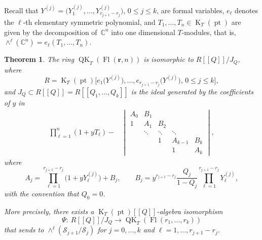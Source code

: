 \documentclass[11pt]{article}
\numberwithin{equation}{section}
\numberwithin{equation}{section}
\newtheorem{Theorem}{Theorem}[section]
\theoremstyle{definition}
\newcommand{\dbb}[1]{[\![#1]\!]}
\newcommand{\br}[1]{\left(#1\right)}
\DeclareMathOperator{\Fl}{Fl}
\DeclareMathOperator{\QK}{QK}
\DeclareMathOperator{\K}{K}
\DeclareMathOperator{\pt}{pt}
\newcommand{\bfr}{{\mathbf r}}
\newcommand{\C}{{\mathbb C}}
\newcommand{\cS}{{\mathcal S}}
\begin{document}
Recall that $Y^{(j)}=\bigl(Y^{(j)}_1,\dots,
{ Y^{(j)}_{r_{j+1}-r_j}}\bigr)$, $0\leq j\leq k$, are formal variables, $e_\ell$ denotes the $\ell$-th elementary symmetric polynomial, and $T_1,\dots, T_n \in \K_T(\pt)$ are given by
the decomposition of~$\C^n$ into one dimensional $T$-modules, that is, $\wedge^\ell(\C^n)=e_\ell(T_1,\dots,T_n)$.

\begin{Theorem}\label{thm:main}
 The ring $\QK_T(\Fl(\bfr,n))$ is isomorphic to $R\dbb{Q}/J_Q$, where
 \[
 R=\K_T(\pt)\bigl[e_1\bigl(Y^{(j)}\bigr),\dots,e_{r_{j+1}-r_j}\bigl(Y^{(j)}\bigr),\, 0\leq j\leq k\bigr],
 \]
 and $J_Q\subset R[\![Q]\!]=R[\![Q_1,\dots,Q_k]\!]$
is the ideal generated by the coefficients of $y$ in
\begin{align}\label{eqn:whit-short-gen}
 \prod_{\ell=1}^{n}(1+yT_\ell)-
 &\begin{vmatrix}
 A_0 & B_1 & & & \\
 1 & A_1 & B_2 & & \\ & \ddots & \ddots & \ddots & \\ & & 1 & A_{k-1} & B_{k}\\ & & & 1 & A_{k}
 \end{vmatrix},
 \end{align}
 where
 \[
 A_j=\prod_{\ell=1}^{r_{j+1}-r_j}\bigl(1+y Y^{(j)}_\ell\bigr)+B_j,\qquad B_j=y^{{r_{j+1}-r_j}}\frac{Q_j}{1-Q_j}\prod_{\ell=1}^{r_{j+1}-r_j}Y^{(j)}_\ell,
 \]
 with the convention that $Q_0=0$.

 More precisely,
there exists a $\K_T(\pt)[\![Q]\!]$-algebra isomorphism
\[
\Psi\colon\ R[\![Q]\!]/J_Q \to \QK_T(\Fl(r_1,\dots,r_k))
\]
that sends  to $\wedge^\ell\br{\cS_{j+1}/\cS_j}$ for $j=0,\dots,k$ and $\ell=1,\dots,r_{j+1}-r_{j}$.
\end{Theorem}
\end{document}

